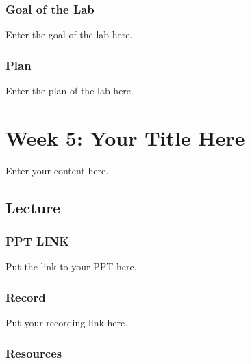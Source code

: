\documentclass[
  letterpaper,
  oneside]{book}
\numberwithin{equation}{section}
\numberwithin{figure}{section}
\theoremstyle{break}
\begin{document}

\section*{Goal of the Lab}\label{goal-of-the-lab-3}


Enter the goal of the lab here.

\section*{Plan}\label{plan-3}


Enter the plan of the lab here.

\part{Week 5: Your Title Here}

Enter your content here.

\chapter*{Lecture}\label{lecture-4}


\section*{PPT LINK}\label{ppt-link-4}


Put the link to your PPT here.

\section*{Record}\label{record-4}


Put your recording link here.

\section*{Resources}\label{resources-4}
\end{document}

